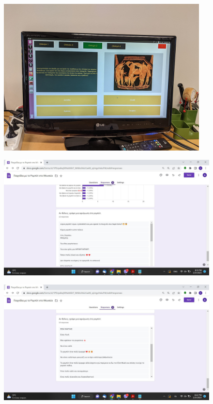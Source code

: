 \begin{figure}[H]\centering
  \includegraphics[scale=1]{./figures/parts/appendix/chapters/06/mouseio_1.jpg}
\end{figure}
\begin{figure}[H]\centering
  \includegraphics[scale=0.4]{./figures/parts/appendix/chapters/06/indy_kids_1.jpg}
\end{figure}
\begin{figure}[H]\centering
  \includegraphics[scale=0.4]{./figures/parts/appendix/chapters/06/indy_kids_2.jpg}
\end{figure}
